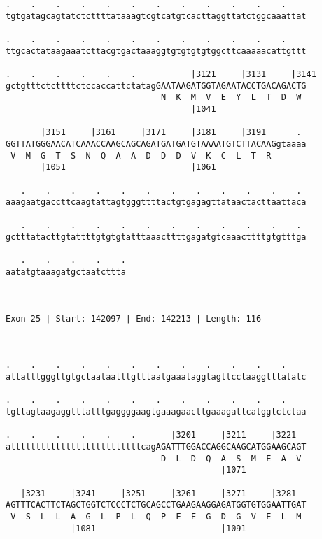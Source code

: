 \documentclass{article}
\begin{document}
\begin{Verbatim}
.    .    .    .    .    .    .    .    .    .    .    .    
tgtgatagcagtatctcttttataaagtcgtcatgtcacttaggttatctggcaaattat
                                                            
.    .    .    .    .    .    .    .    .    .    .    .    
ttgcactataagaaatcttacgtgactaaaggtgtgtgtgtggcttcaaaaacattgttt
                                                            
.    .    .    .    .    .           |3121     |3131     |3141
gctgtttctcttttctccaccattctatagGAATAAGATGGTAGAATACCTGACAGACTG
                               N  K  M  V  E  Y  L  T  D  W 
                                     |1041                  
  
       |3151     |3161     |3171     |3181     |3191      . 
GGTTATGGGAACATCAAACCAAGCAGCAGATGATGATGTAAAATGTCTTACAAGgtaaaa
 V  M  G  T  S  N  Q  A  A  D  D  D  V  K  C  L  T  R       
       |1051                         |1061                  
  
   .    .    .    .    .    .    .    .    .    .    .    . 
aaagaatgaccttcaagtattagtgggttttactgtgagagttataactacttaattaca
                                                            
   .    .    .    .    .    .    .    .    .    .    .    . 
gctttatacttgtattttgtgtgtatttaaacttttgagatgtcaaacttttgtgtttga
                                                            
   .    .    .    .    .
aatatgtaaagatgctaatcttta
                        
                        
 
Exon 25 | Start: 142097 | End: 142213 | Length: 116



.    .    .    .    .    .    .    .    .    .    .    .    
attatttgggttgtgctaataatttgtttaatgaaataggtagttcctaaggtttatatc
                                                            
.    .    .    .    .    .    .    .    .    .    .    .    
tgttagtaagaggtttatttgaggggaagtgaaagaacttgaaagattcatggtctctaa
                                                            
.    .    .    .    .    .       |3201     |3211     |3221  
attttttttttttttttttttttttttcagAGATTTGGACCAGGCAAGCATGGAAGCAGT
                               D  L  D  Q  A  S  M  E  A  V 
                                           |1071            
  
   |3231     |3241     |3251     |3261     |3271     |3281  
AGTTTCACTTCTAGCTGGTCTCCCTCTGCAGCCTGAAGAAGGAGATGGTGTGGAATTGAT
 V  S  L  L  A  G  L  P  L  Q  P  E  E  G  D  G  V  E  L  M 
             |1081                         |1091            
  

\end{Verbatim}
\end{document}

